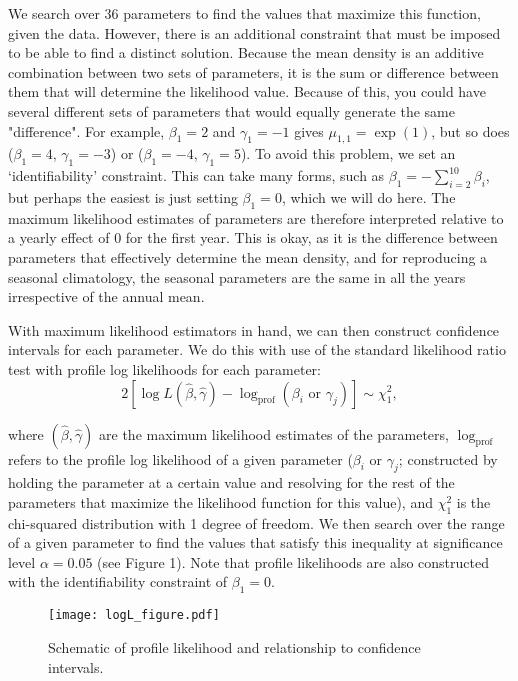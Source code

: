 \documentclass[11pt]{article}
\begin{document}
We search over 36 parameters to find the values that maximize this function, given the data. However, there is an additional constraint that must be imposed to be able to find a distinct solution. Because the mean density is an additive combination between two sets of parameters, it is the sum or difference between them that will determine the likelihood value. Because of this, you could have several different sets of parameters that would equally generate the same "difference". For example, $\beta_1 = 2$ and $\gamma_1= -1$ gives $\mu_{1,1} = \exp(1)$, but so does ($\beta_1 = 4$, $\gamma_1= -3$) or ($\beta_1 = -4$, $\gamma_1= 5$). To avoid this problem, we set an `identifiability' constraint. This can take many forms, such as $\beta_1 = - \sum_{i=2}^{10}\beta_i$, but perhaps the easiest is just setting $\beta_1 =0$, which we will do here. The maximum likelihood estimates of parameters are therefore interpreted relative to a yearly effect of 0 for the first year. This is okay, as it is the difference between parameters that effectively determine the mean density, and for reproducing a seasonal climatology, the seasonal parameters are the same in all the years irrespective of the annual mean.

With maximum likelihood estimators in hand, we can then construct confidence intervals for each parameter. We do this with use of the standard likelihood ratio test with profile log likelihoods for each parameter:
\[
2\left[ \log L(\hat{\beta},\hat{\gamma}) - \log_{\text{prof}}(\beta_i \text{ or } \gamma_j) \right] \sim \chi^2_1,
\]

\noindent where $(\hat{\beta},\hat{\gamma})$ are the maximum likelihood estimates of the parameters, $\log_{\text{prof}}$ refers to the profile log likelihood of a given parameter ($\beta_i \text{ or } \gamma_j$; constructed by holding the parameter at a certain value and resolving for the rest of the parameters that maximize the likelihood function for this value), and $\chi^2_1$ is the chi-squared distribution with 1 degree of freedom. We then search over the range of a given parameter to find the values that satisfy this inequality at significance level $\alpha=0.05$ (see Figure 1). Note that profile likelihoods are also constructed with the identifiability constraint of $\beta_1 =0$.

\begin{figure}[h]
\centering
\texttt{[image: logL\_figure.pdf]}
\caption{Schematic of profile likelihood and relationship to confidence intervals.}
\end{figure}
\end{document}
